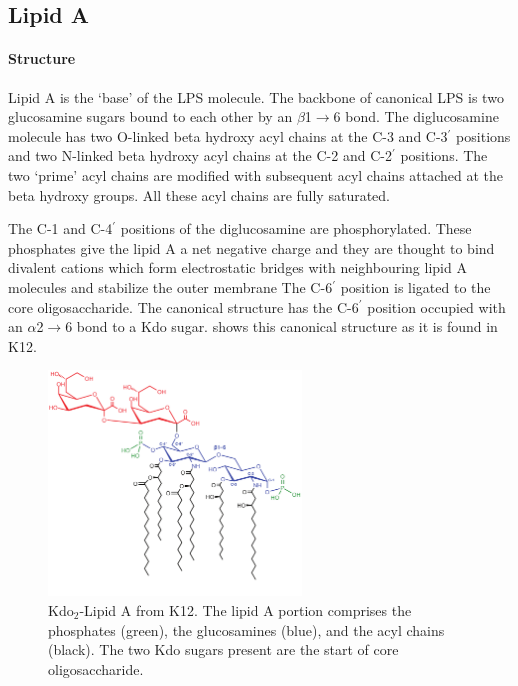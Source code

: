   \subsection{Lipid A}\label{sec:lipidA-intro}
  
    \paragraph{Structure}
    
    Lipid A is the `base' of the \ac{LPS} molecule. The backbone of canonical \ac{LPS} is two glucosamine sugars bound to each other by an $\beta$1$\rightarrow$6 bond. The
diglucosamine molecule has two O-linked beta hydroxy acyl chains at the C-3 and C-3$^\prime$ positions and two N-linked beta hydroxy acyl chains at the C-2 and C-2$^\prime$
positions. The two `prime' acyl chains are modified with subsequent acyl chains attached at the beta hydroxy groups. All these acyl chains are fully saturated.
    
    The C-1 and C-4$^\prime$ positions of the diglucosamine are phosphorylated. These phosphates give the lipid A a net negative charge and they are thought to bind divalent
cations which form electrostatic bridges with neighbouring lipid A molecules and stabilize the outer membrane The C-6$^\prime$ position is
ligated to the core oligosaccharide. The canonical structure has the C-6$^\prime$ position occupied with an $\alpha$2$\rightarrow$6 bond to a Kdo sugar.  shows
this canonical structure as it is found in \ecoli K12.

\begin{figure}[htb]
  	\begin{center}
   		\includegraphics[width=0.6\textwidth]{intro/img/lipidA.pdf}
   	\end{center}
   	\caption[Kdo$_{2}$-Lipid A from \ecoli K12]{ Kdo$_{2}$-Lipid A from \ecoli K12. The lipid A portion comprises the phosphates (green), the glucosamines (blue), and the acyl
chains (black). The two Kdo sugars present are the start of core oligosaccharide. }
\label{fig:lipidA}
\end{figure}

